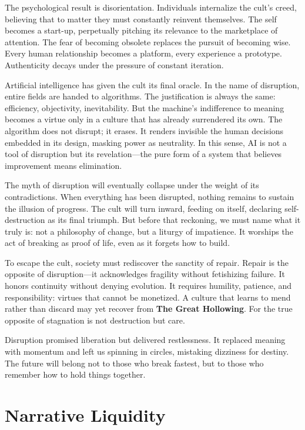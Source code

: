 \documentclass[11pt,twoside]{book}
\begin{document}
The psychological result is disorientation.  Individuals internalize the cult’s creed, believing that to matter they must constantly reinvent themselves.  The self becomes a start-up, perpetually pitching its relevance to the marketplace of attention.  The fear of becoming obsolete replaces the pursuit of becoming wise.  Every human relationship becomes a platform, every experience a prototype.  Authenticity decays under the pressure of constant iteration.

Artificial intelligence has given the cult its final oracle.  In the name of disruption, entire fields are handed to algorithms.  The justification is always the same: efficiency, objectivity, inevitability.  But the machine’s indifference to meaning becomes a virtue only in a culture that has already surrendered its own.  The algorithm does not disrupt; it erases.  It renders invisible the human decisions embedded in its design, masking power as neutrality.  In this sense, AI is not a tool of disruption but its revelation—the pure form of a system that believes improvement means elimination.

The myth of disruption will eventually collapse under the weight of its contradictions.  When everything has been disrupted, nothing remains to sustain the illusion of progress.  The cult will turn inward, feeding on itself, declaring self-destruction as its final triumph.  But before that reckoning, we must name what it truly is: not a philosophy of change, but a liturgy of impatience.  It worships the act of breaking as proof of life, even as it forgets how to build.

To escape the cult, society must rediscover the sanctity of repair.  Repair is the opposite of disruption—it acknowledges fragility without fetishizing failure.  It honors continuity without denying evolution.  It requires humility, patience, and responsibility: virtues that cannot be monetized.  A culture that learns to mend rather than discard may yet recover from \textbf{The Great Hollowing}.  For the true opposite of stagnation is not destruction but care.

Disruption promised liberation but delivered restlessness.  It replaced meaning with momentum and left us spinning in circles, mistaking dizziness for destiny.  The future will belong not to those who break fastest, but to those who remember how to hold things together.

%
\chapter{Narrative Liquidity}
\label{ch:08}
\end{document}
